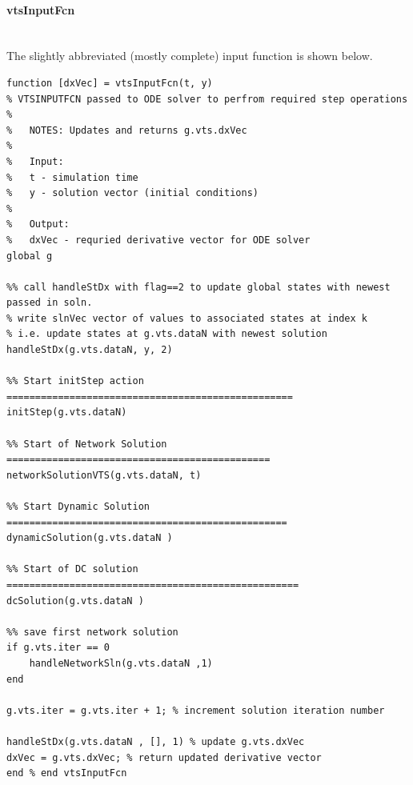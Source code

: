 \documentclass[12pt]{article}
\begin{document}
\paragraph{vtsInputFcn} \ \\
The slightly abbreviated (mostly complete) input function is shown below.
\begin{verbatim}
function [dxVec] = vtsInputFcn(t, y)
% VTSINPUTFCN passed to ODE solver to perfrom required step operations
%
%   NOTES: Updates and returns g.vts.dxVec
%
%   Input:
%   t - simulation time
%   y - solution vector (initial conditions)
%
%   Output:
%   dxVec - requried derivative vector for ODE solver
global g

%% call handleStDx with flag==2 to update global states with newest passed in soln.
% write slnVec vector of values to associated states at index k
% i.e. update states at g.vts.dataN with newest solution
handleStDx(g.vts.dataN, y, 2)

%% Start initStep action ==================================================
initStep(g.vts.dataN)

%% Start of Network Solution ==============================================
networkSolutionVTS(g.vts.dataN, t)

%% Start Dynamic Solution =================================================
dynamicSolution(g.vts.dataN )

%% Start of DC solution ===================================================
dcSolution(g.vts.dataN )

%% save first network solution
if g.vts.iter == 0
    handleNetworkSln(g.vts.dataN ,1)
end

g.vts.iter = g.vts.iter + 1; % increment solution iteration number

handleStDx(g.vts.dataN , [], 1) % update g.vts.dxVec
dxVec = g.vts.dxVec; % return updated derivative vector
end % end vtsInputFcn
\end{verbatim}

\pagebreak
\end{document}
